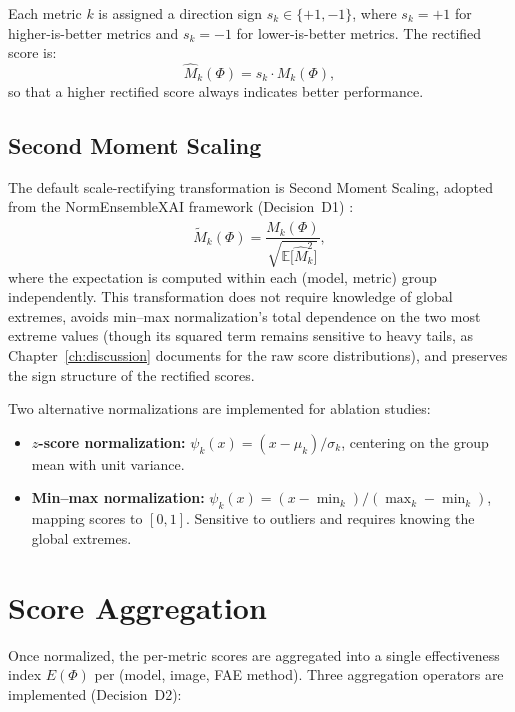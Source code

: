 Each metric $k$ is assigned a direction sign $s_k \in \{+1, -1\}$, where
$s_k = +1$ for higher-is-better metrics and $s_k = -1$ for
lower-is-better metrics. The rectified score is:
\begin{equation}
    \hat{M}_k(\Phi) = s_k \cdot M_k(\Phi),
\end{equation}
so that a higher rectified score always indicates better performance.

\subsection{Second Moment Scaling}

The default scale-rectifying transformation is Second Moment Scaling,
adopted from the NormEnsembleXAI framework (Decision~D1)
\cite{hryniewska2024normensemblexai}:
\begin{equation}
    \tilde{M}_k(\Phi) = \frac{\hat{M}_k(\Phi)}{\sqrt{\mathbb{E}\bigl[\hat{M}_k^2\bigr]}},
\end{equation}
where the expectation is computed within each (model, metric) group
independently. This transformation does not require knowledge of global
extremes, avoids min--max normalization's total dependence on the two most
extreme values (though its squared term remains sensitive to heavy tails,
as Chapter~\ref{ch:discussion} documents for the raw score
distributions), and
preserves the sign structure of the rectified scores.

Two alternative normalizations are implemented for ablation studies:
\begin{itemize}
    \item \textbf{$z$-score normalization:}
    $\psi_k(x) = (x - \mu_k) / \sigma_k$, centering on the group mean with
    unit variance.
    \item \textbf{Min--max normalization:}
    $\psi_k(x) = (x - \min_k) / (\max_k - \min_k)$, mapping scores to
    $[0, 1]$. Sensitive to outliers and requires knowing the global extremes.
\end{itemize}

\section{Score Aggregation}
\label{sec:aggregation}

Once normalized, the per-metric scores are aggregated into a single
effectiveness index $E(\Phi)$ per (model, image, FAE method). Three
aggregation operators are implemented (Decision~D2):

